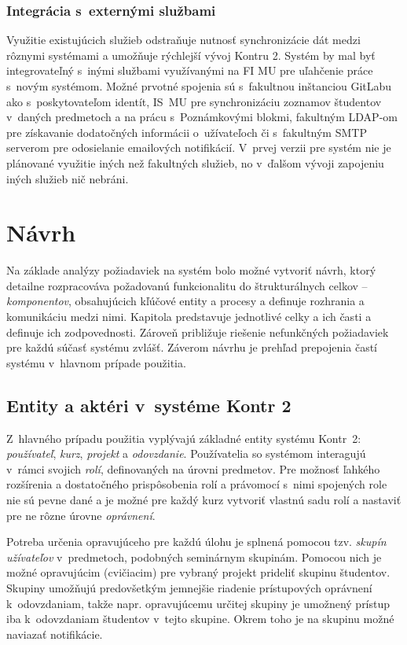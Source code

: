 \documentclass[
  digital, %
  oneside, %
  table,   %
  lof,     %
  lot,   %
]{fithesis3}
\begin{document}
\subsection{Integrácia s~externými službami}
Využitie existujúcich služieb odstraňuje nutnosť synchronizácie dát medzi rôznymi systémami a umožňuje rýchlejší vývoj Kontru 2. Systém by mal byť integrovateľný s~inými službami využívanými na FI MU pre uľahčenie práce s~novým systémom. Možné prvotné spojenia sú s~fakultnou inštanciou GitLabu ako s~poskytovateľom identít, IS~MU pre synchronizáciu zoznamov študentov v~daných predmetoch a na prácu s~Poznámkovými blokmi, fakultným LDAP-om pre získavanie dodatočných informácii o~užívateľoch či s~fakultným SMTP serverom pre odosielanie emailových notifikácií. V~prvej verzii pre systém nie je plánované využitie iných než fakultných služieb, no v~ďalšom vývoji zapojeniu iných služieb nič nebráni.

\chapter{Návrh}
Na základe analýzy požiadaviek na systém bolo možné vytvoriť návrh, ktorý detailne rozpracováva požadovanú funkcionalitu do štrukturálnych celkov -- \emph{komponentov}, obsahujúcich kľúčové entity a procesy a definuje rozhrania a komunikáciu medzi nimi. Kapitola predstavuje jednotlivé celky a ich časti a definuje ich zodpovednosti. Zároveň približuje riešenie nefunkčných požiadaviek pre každú súčasť systému zvlášť. Záverom návrhu je prehľad prepojenia častí systému v~hlavnom prípade použitia. 

\section{Entity a aktéri v~systéme Kontr 2}

Z~hlavného prípadu použitia vyplývajú základné entity systému Kontr~2: \emph{používateľ}, \emph{kurz}, \emph{projekt} a \emph{odovzdanie}. Používatelia so systémom interagujú v~rámci svojich \emph{rolí}, definovaných na úrovni predmetov. Pre možnosť ľahkého rozšírenia a dostatočného prispôsobenia rolí a právomocí s~nimi spojených role nie sú pevne dané a je možné pre každý kurz vytvoriť vlastnú sadu rolí a nastaviť pre ne rôzne úrovne \emph{oprávnení}.

Potreba určenia opravujúceho pre každú úlohu je splnená pomocou tzv. \emph{skupín užívateľov} v~predmetoch, podobných seminárnym skupinám. Pomocou nich je možné opravujúcim (cvičiacim) pre vybraný projekt prideliť skupinu študentov. Skupiny umožňujú predovšetkým jemnejšie riadenie prístupových oprávnení k~odovzdaniam, takže napr. opravujúcemu určitej skupiny je umožnený prístup iba k~odovzdaniam študentov v~tejto skupine. Okrem toho je na skupinu možné naviazať notifikácie.
\end{document}
